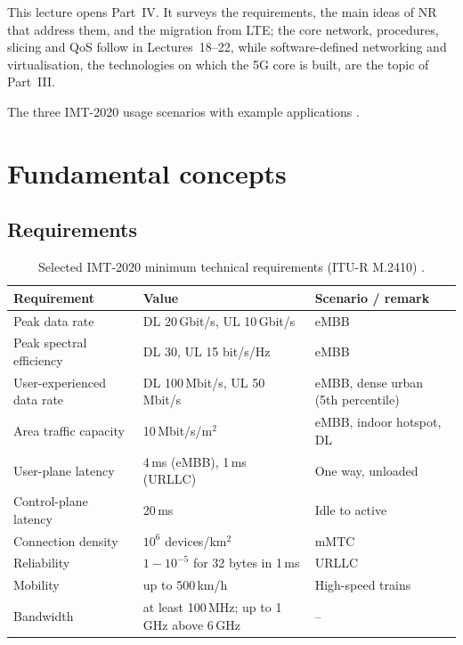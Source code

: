 \documentclass[11pt,a4paper]{article}
\begin{document}
This lecture opens Part~IV. It surveys the requirements, the main ideas of NR that address them, and the
migration from LTE; the core network, procedures, slicing and QoS follow in Lectures~18--22, while
software-defined networking and virtualisation, the technologies on which the 5G core is built, are the
topic of Part~III.

\begin{acnfigure}
  \caption{The three IMT-2020 usage scenarios with example applications \cite{itu2015m2083}.}
  \label{fig:usage}
\end{acnfigure}

\section{Fundamental concepts}

\subsection{Requirements}
\begin{table}[htbp]
\centering\small
\caption{Selected IMT-2020 minimum technical requirements (ITU-R M.2410) \cite{itu2017m2410}.}\label{tab:req}
\begin{tabularx}{\linewidth}{@{}l l Y@{}}
\toprule
{}Requirement & Value & Scenario / remark \\
\midrule
Peak data rate             & DL 20\,Gbit/s, UL 10\,Gbit/s  & eMBB \\
Peak spectral efficiency   & DL 30, UL 15 bit/s/Hz         & eMBB \\
User-experienced data rate & DL 100\,Mbit/s, UL 50\,Mbit/s & eMBB, dense urban (5th percentile) \\
Area traffic capacity      & 10\,Mbit/s/m$^2$              & eMBB, indoor hotspot, DL \\
User-plane latency         & 4\,ms (eMBB), 1\,ms (URLLC)   & One way, unloaded \\
Control-plane latency      & 20\,ms                        & Idle to active \\
Connection density         & $10^6$ devices/km$^2$         & mMTC \\
Reliability                & $1-10^{-5}$ for 32 bytes in 1\,ms & URLLC \\
Mobility                   & up to 500\,km/h               & High-speed trains \\
Bandwidth                  & at least 100\,MHz; up to 1\,GHz above 6\,GHz & -- \\
\bottomrule
\end{tabularx}
\end{table}
\end{document}
